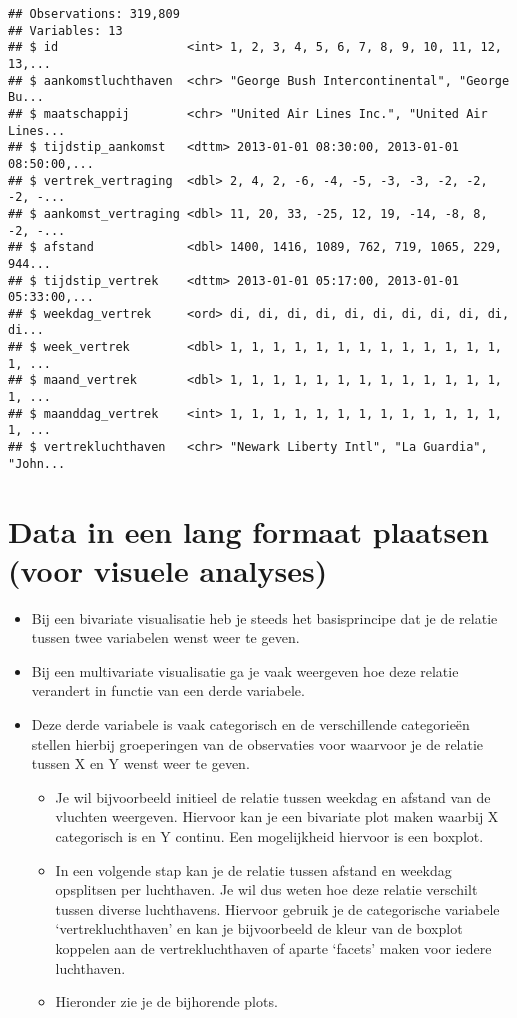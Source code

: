 \documentclass[]{memoir}
\providecommand{\tightlist}{%
  \setlength{\itemsep}{0pt}\setlength{\parskip}{0pt}}
\begin{document}
\begin{verbatim}
## Observations: 319,809
## Variables: 13
## $ id                  <int> 1, 2, 3, 4, 5, 6, 7, 8, 9, 10, 11, 12, 13,...
## $ aankomstluchthaven  <chr> "George Bush Intercontinental", "George Bu...
## $ maatschappij        <chr> "United Air Lines Inc.", "United Air Lines...
## $ tijdstip_aankomst   <dttm> 2013-01-01 08:30:00, 2013-01-01 08:50:00,...
## $ vertrek_vertraging  <dbl> 2, 4, 2, -6, -4, -5, -3, -3, -2, -2, -2, -...
## $ aankomst_vertraging <dbl> 11, 20, 33, -25, 12, 19, -14, -8, 8, -2, -...
## $ afstand             <dbl> 1400, 1416, 1089, 762, 719, 1065, 229, 944...
## $ tijdstip_vertrek    <dttm> 2013-01-01 05:17:00, 2013-01-01 05:33:00,...
## $ weekdag_vertrek     <ord> di, di, di, di, di, di, di, di, di, di, di...
## $ week_vertrek        <dbl> 1, 1, 1, 1, 1, 1, 1, 1, 1, 1, 1, 1, 1, 1, ...
## $ maand_vertrek       <dbl> 1, 1, 1, 1, 1, 1, 1, 1, 1, 1, 1, 1, 1, 1, ...
## $ maanddag_vertrek    <int> 1, 1, 1, 1, 1, 1, 1, 1, 1, 1, 1, 1, 1, 1, ...
## $ vertrekluchthaven   <chr> "Newark Liberty Intl", "La Guardia", "John...
\end{verbatim}

\section{Data in een lang formaat plaatsen (voor visuele
analyses)}\label{data-in-een-lang-formaat-plaatsen-voor-visuele-analyses}

\begin{itemize}
\tightlist
\item
  Bij een bivariate visualisatie heb je steeds het basisprincipe dat je
  de relatie tussen twee variabelen wenst weer te geven.
\item
  Bij een multivariate visualisatie ga je vaak weergeven hoe deze
  relatie verandert in functie van een derde variabele.
\item
  Deze derde variabele is vaak categorisch en de verschillende
  categorieën stellen hierbij groeperingen van de observaties voor
  waarvoor je de relatie tussen X en Y wenst weer te geven.

  \begin{itemize}
  \tightlist
  \item
    Je wil bijvoorbeeld initieel de relatie tussen weekdag en afstand
    van de vluchten weergeven. Hiervoor kan je een bivariate plot maken
    waarbij X categorisch is en Y continu. Een mogelijkheid hiervoor is
    een boxplot.
  \item
    In een volgende stap kan je de relatie tussen afstand en weekdag
    opsplitsen per luchthaven. Je wil dus weten hoe deze relatie
    verschilt tussen diverse luchthavens. Hiervoor gebruik je de
    categorische variabele `vertrekluchthaven' en kan je bijvoorbeeld de
    kleur van de boxplot koppelen aan de vertrekluchthaven of aparte
    `facets' maken voor iedere luchthaven.
  \item
    Hieronder zie je de bijhorende plots.
  \end{itemize}
\end{itemize}
\end{document}
